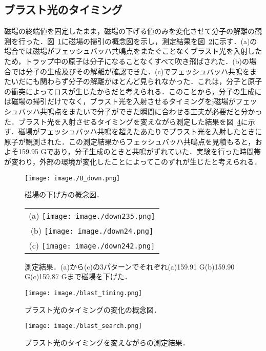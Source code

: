 \documentclass[11pt,a4j,notitlepage]{jreport}
\newcommand{\fig}[1]{図~\ref{#1}}	%
\begin{document}
\subsection{ブラスト光のタイミング}
磁場の終端値を固定したまま，磁場の下げる値のみを変化させて分子の解離の観測を行った．\fig{fig4.3.4}に磁場の掃引の概念図を示し，測定結果を\fig{fig4.3.5}に示す．(a)の場合では磁場がフェッシュバッハ共鳴点をまたぐことなくブラスト光を入射したため，トラップ中の原子は分子になることなくすべて吹き飛ばされた．(b)の場合では分子の生成及びその解離が確認できた．(c)でフェッシュバッハ共鳴をまたいだにも関わらず分子の解離がほとんど見られなかった．これは，分子と原子の衝突によってロスが生じたからだと考えられる．このことから，分子の生成には磁場の掃引だけでなく，ブラスト光を入射させるタイミングをj磁場がフェッシュバッハ共鳴点をまたいで分子ができた瞬間に合わせる工夫が必要だと分かった．ブラスト光を入射させるタイミングを変えながら測定した結果を\fig{fig4.3.6}に示す．磁場がフェッシュバッハ共鳴を超えたあたりでブラスト光を入射したときに原子が観測された．この測定結果からフェッシュバッハ共鳴点を見積もると，およそ159.95 Gであり，分子生成のときと共鳴がずれていた．実験を行った時間帯が変わり，外部の環境が変化したことによってこのずれが生じたと考えられる．
\begin{figure}[H]
	\centering
		\texttt{[image: image./B\_down.png]}
	\caption{磁場の下げ方の概念図．}
	\label{fig4.3.4}
\end{figure}
\begin{figure}[H]
	\begin{tabular}{c}
		\begin{minipage}[t]{1\hsize}
			\centering
			(a)
				\texttt{[image: image./down235.png]}
		\end{minipage} \\
		\begin{minipage}[t]{1\hsize}
			\centering
			(b)
				\texttt{[image: image./down24.png]}
		\end{minipage} \\
		\begin{minipage}[t]{1\hsize}
			\centering
			(c)
				\texttt{[image: image./down242.png]}
		\end{minipage}
	\end{tabular}
	\caption{測定結果．(a)から(c)の3パターンでそれぞれ(a)159.91 G(b)159.90 G(c)159.87 Gまで磁場を下げた．}
	\label{fig4.3.5}
\end{figure}
\begin{figure}[H]
	\centering
		\texttt{[image: image./blast\_timing.png]}
	\caption{ブラスト光のタイミングの変化の概念図．}
	\label{fig4.3.5.5}
\end{figure}
\begin{figure}[H]
	\centering
		\texttt{[image: image./blast\_search.png]}
	\caption{ブラスト光のタイミングを変えながらの測定結果．}
	\label{fig4.3.6}
\end{figure}
\end{document}
